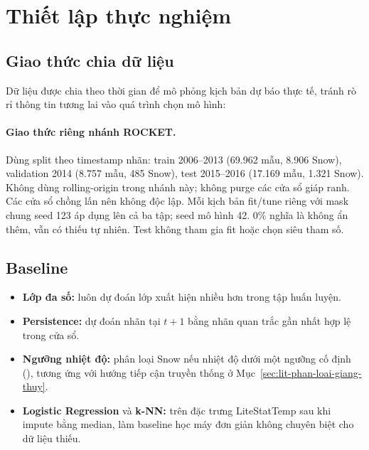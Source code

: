 \section{Thiết lập thực nghiệm}
\label{sec:thiet-lap-thuc-nghiem}

\subsection{Giao thức chia dữ liệu}
\label{sec:giao-thuc-chia-du-lieu}

Dữ liệu được chia theo thời gian để mô phỏng kịch bản dự báo thực tế, tránh rò rỉ thông
tin tương lai vào quá trình chọn mô hình: 

\paragraph{Giao thức riêng nhánh ROCKET.} Dùng split theo timestamp nhãn: train 2006--2013 (69.962 mẫu, 8.906 Snow), validation 2014 (8.757 mẫu, 485 Snow), test 2015--2016 (17.169 mẫu, 1.321 Snow). Không dùng rolling-origin trong nhánh này; không purge các cửa sổ giáp ranh. Các cửa sổ chồng lấn nên không độc lập. Mỗi kịch bản fit/tune riêng với mask chung seed 123 áp dụng lên cả ba tập; seed mô hình 42. 0\% nghĩa là không ẩn thêm, vẫn có thiếu tự nhiên. Test không tham gia fit hoặc chọn siêu tham số.

\subsection{Baseline}
\label{sec:baseline}

\begin{itemize}
  \item \textbf{Lớp đa số:} luôn dự đoán lớp xuất hiện nhiều hơn trong tập huấn luyện.
  \item \textbf{Persistence:} dự đoán nhãn tại $t+1$ bằng nhãn quan trắc gần nhất hợp lệ
        trong cửa sổ.
  \item \textbf{Ngưỡng nhiệt độ:} phân loại Snow nếu nhiệt độ dưới một ngưỡng cố định
        (), tương ứng với
        hướng tiếp cận truyền thống ở Mục~\ref{sec:lit-phan-loai-giang-thuy}.
  \item \textbf{Logistic Regression} và \textbf{k-NN:} trên đặc trưng LiteStatTemp sau
        khi impute bằng median, làm baseline học máy đơn giản không chuyên biệt cho dữ
        liệu thiếu.
\end{itemize}

